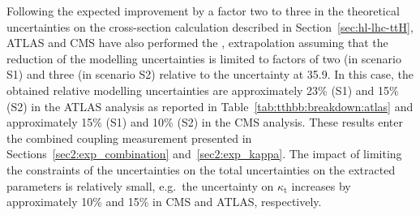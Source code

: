 Following the expected improvement by a factor two to three in the theoretical uncertainties on the \ttHF cross-section calculation described in Section~\ref{sec:hl-lhc-ttH}, ATLAS and CMS have also performed the \ttH, \Htobb extrapolation assuming that the reduction of the \ttHF modelling uncertainties is limited to factors of two (in scenario S1) and three (in scenario S2) relative to the uncertainty at 35.9\fbinv.
In this case, the obtained relative \ttHF modelling uncertainties are approximately 23\% (S1) and 15\% (S2) in the ATLAS analysis as reported in Table~\ref{tab:tthbb:breakdown:atlas} and approximately 15\% (S1) and 10\% (S2) in the CMS analysis. These results enter the combined coupling measurement presented in Sections~\ref{sec2:exp_combination} and~\ref{sec2:exp_kappa}. The impact of limiting the constraints of the \ttHF uncertainties on the total uncertainties on the extracted parameters is relatively small, e.g.\ the uncertainty on $\kappa_{\text{t}}$ increases by approximately 10\% and 15\% in CMS and ATLAS, respectively. 
